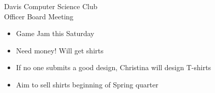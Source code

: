 \documentclass{article}
\begin{document}
\begin{Minutes}{Davis Computer Science Club\\Officer Board Meeting}
\begin {itemize}
    \item Game Jam this Saturday
\end {itemize}

\begin {itemize}
    \item Need money! Will get shirts
    \item If no one submits a good design, Christina will design T-shirts
    \item Aim to sell shirts beginning of Spring quarter
\end {itemize}

\end{Minutes}
\thispagestyle{creditfooter}
\end{document}
